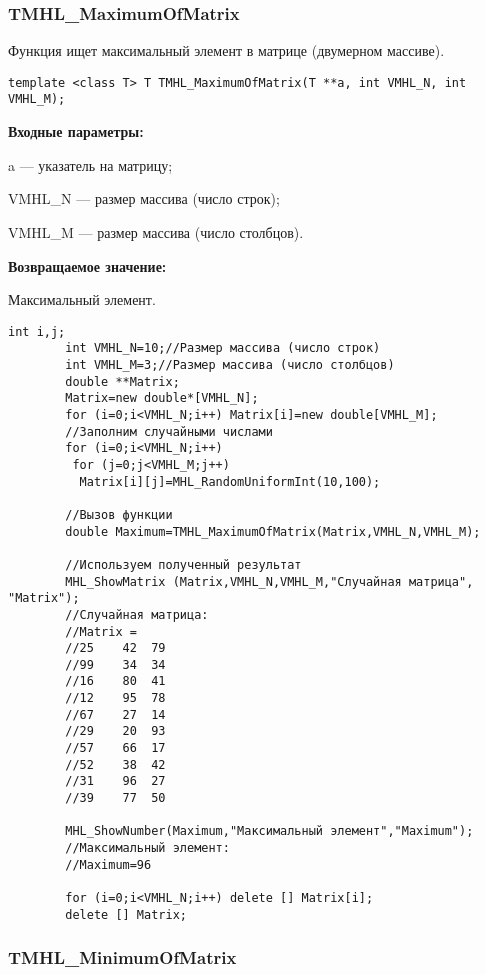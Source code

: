 \documentclass[a4paper,12pt]{article}
\begin{document}
\subsubsection{TMHL\_MaximumOfMatrix}\label{TMHL_MaximumOfMatrix}

Функция ищет максимальный элемент в матрице (двумерном массиве).


\begin{lstlisting}[label=code_syntax_TMHL_MaximumOfMatrix,caption=Синтаксис]
template <class T> T TMHL_MaximumOfMatrix(T **a, int VMHL_N, int VMHL_M);
\end{lstlisting}

\textbf{Входные параметры:}

 a --- указатель на матрицу;
 
 VMHL\_N --- размер массива (число строк);
 
 VMHL\_M --- размер массива (число столбцов).

\textbf{Возвращаемое значение:}

 Максимальный элемент.


\begin{lstlisting}[label=code_use_TMHL_MaximumOfMatrix,caption=Пример использования]
        int i,j;
        int VMHL_N=10;//Размер массива (число строк)
        int VMHL_M=3;//Размер массива (число столбцов)
        double **Matrix;
        Matrix=new double*[VMHL_N];
        for (i=0;i<VMHL_N;i++) Matrix[i]=new double[VMHL_M];
        //Заполним случайными числами
        for (i=0;i<VMHL_N;i++)
         for (j=0;j<VMHL_M;j++)
          Matrix[i][j]=MHL_RandomUniformInt(10,100);

        //Вызов функции
        double Maximum=TMHL_MaximumOfMatrix(Matrix,VMHL_N,VMHL_M);

        //Используем полученный результат
        MHL_ShowMatrix (Matrix,VMHL_N,VMHL_M,"Случайная матрица", "Matrix");
        //Случайная матрица:
        //Matrix =
        //25	42	79
        //99	34	34
        //16	80	41
        //12	95	78
        //67	27	14
        //29	20	93
        //57	66	17
        //52	38	42
        //31	96	27
        //39	77	50

        MHL_ShowNumber(Maximum,"Максимальный элемент","Maximum");
        //Максимальный элемент:
        //Maximum=96

        for (i=0;i<VMHL_N;i++) delete [] Matrix[i];
        delete [] Matrix;
\end{lstlisting}

\subsubsection{TMHL\_MinimumOfMatrix}\label{TMHL_MinimumOfMatrix}
\end{document}
